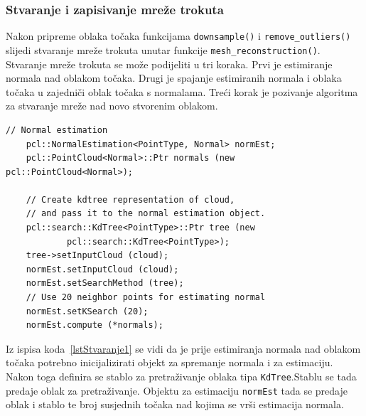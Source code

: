 
\newpage
\subsubsection{Stvaranje i zapisivanje mreže trokuta} %
\label{ssub:Stvaranje i zapisivanje mreže trokuta}

Nakon pripreme oblaka točaka funkcijama \texttt{downsample()} i
\texttt{remove\_outliers()} slijedi stvaranje mreže trokuta unutar
funkcije \texttt{mesh\_reconstruction()}. Stvaranje mreže trokuta se
može podijeliti u tri koraka. Prvi je estimiranje normala nad oblakom
točaka. Drugi je spajanje estimiranih normala i oblaka točaka u
zajedniči oblak točaka s normalama. Treći korak je pozivanje algoritma
za stvaranje mreže nad novo stvorenim oblakom.

\begin{lstlisting}[label=lstStvaranje1, caption={Dio izvornog koda iz
funkcije \texttt{reconstruct\_mesh()} }]
    // Normal estimation
    pcl::NormalEstimation<PointType, Normal> normEst;
    pcl::PointCloud<Normal>::Ptr normals (new pcl::PointCloud<Normal>);
    
    // Create kdtree representation of cloud, 
    // and pass it to the normal estimation object. 
    pcl::search::KdTree<PointType>::Ptr tree (new
            pcl::search::KdTree<PointType>);
    tree->setInputCloud (cloud);
    normEst.setInputCloud (cloud);
    normEst.setSearchMethod (tree);
    // Use 20 neighbor points for estimating normal
    normEst.setKSearch (20);
    normEst.compute (*normals);
\end{lstlisting}

Iz ispisa koda~\ref{lstStvaranje1} se vidi da je prije estimiranja
normala nad oblakom točaka potrebno inicijalizirati objekt za
spremanje normala i za estimaciju. Nakon toga definira se
stablo za pretraživanje oblaka tipa \texttt{KdTree}.\footnotemark[3]
Stablu se tada predaje oblak za pretraživanje. Objektu za
estimaciju \texttt{normEst} tada se predaje oblak i stablo te broj
susjednih točaka nad kojima se vrši estimacija
normala\footnotemark[4]. 


